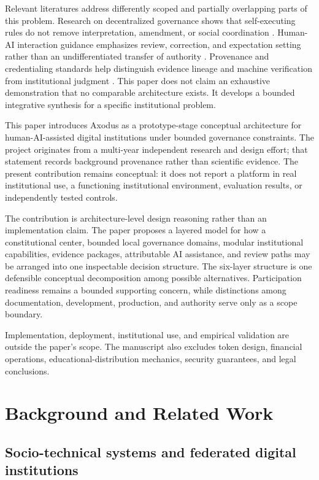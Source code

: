 \documentclass[11pt]{article}
\begin{document}
Relevant literatures address differently scoped and partially overlapping
parts of this problem. Research on decentralized governance shows
that self-executing rules do not remove interpretation, amendment, or social
coordination \citep{hassan2021dao,hsieh2018bitcoin}. Human-AI interaction
guidance emphasizes review, correction, and expectation setting rather than an
undifferentiated transfer of authority \citep{amershi2019guidelines}.
Provenance and credentialing standards help distinguish evidence lineage and
machine verification from institutional judgment
\citep{w3c2013provdm,w3c2025vcdm}. This paper does not claim an exhaustive
demonstration that no comparable architecture exists. It develops a bounded
integrative synthesis for a specific institutional problem.

This paper introduces Axodus as a prototype-stage conceptual architecture for
human-AI-assisted digital institutions under bounded governance constraints.
The project originates from a multi-year independent research and design
effort; that statement records background provenance rather than scientific
evidence. The present contribution remains conceptual: it does not report a
platform in real institutional use, a functioning institutional environment,
evaluation results, or independently tested controls.

The contribution is architecture-level design reasoning rather than an
implementation claim. The paper proposes a layered model for how a
constitutional center, bounded local governance domains, modular
institutional capabilities, evidence packages, attributable AI assistance,
and review paths may be arranged into one inspectable decision structure. The
six-layer structure is one defensible conceptual decomposition among possible
alternatives. Participation readiness remains a bounded supporting concern,
while distinctions among documentation, development, production, and
authority serve only as a scope boundary.

Implementation, deployment, institutional use, and empirical validation are
outside the paper's scope. The manuscript also excludes token design,
financial operations, educational-distribution mechanics, security
guarantees, and legal conclusions.

\section{Background and Related Work}

\subsection{Socio-technical systems and federated digital institutions}
\end{document}
